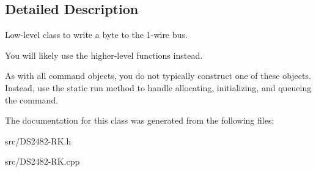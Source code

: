 \subsection{Detailed Description}
Low-\/level class to write a byte to the 1-\/wire bus. 

You will likely use the higher-\/level functions instead.

As with all command objects, you do not typically construct one of these objects. Instead, use the static run method to handle allocating, initializing, and queueing the command. 

The documentation for this class was generated from the following files\+:\begin{DoxyCompactItemize}
\item 
src/D\+S2482-\/\+R\+K.\+h\item 
src/D\+S2482-\/\+R\+K.\+cpp\end{DoxyCompactItemize}
